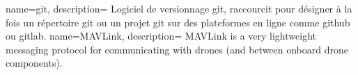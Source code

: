 

{
    name={git},
    description={
    Logiciel de versionnage git, raccourcit pour désigner à la fois un répertoire git ou un projet git sur des plateformes en ligne comme github ou gitlab.
    }
}
{
    name={MAVLink},
    description={
        MAVLink is a very lightweight messaging protocol for communicating with drones (and between onboard drone components).
    }
}
